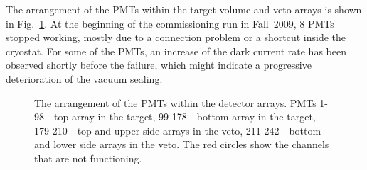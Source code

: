 The arrangement of the PMTs within the target volume and veto arrays is shown in Fig.~\ref{figPMTarrangement}. 
At the beginning of the commissioning run in Fall~2009, 8 PMTs stopped working, mostly due to a connection problem or a shortcut inside the cryostat. For some of the PMTs, an increase of the dark current rate has been observed shortly before the failure, which might indicate a progressive deterioration of the vacuum sealing.

\begin{figure}[!h]
\centering
{}
\caption[The arrangement of the PMTs within the detector arrays]{The arrangement of the PMTs within the detector arrays. PMTs 1-98 - top array in the target, 99-178 - bottom array in the target, 179-210 - top and upper side arrays in the veto, 211-242 - bottom and lower side arrays in the veto. The red circles show the channels that are not functioning.}
\label{figPMTarrangement}
\end{figure}


